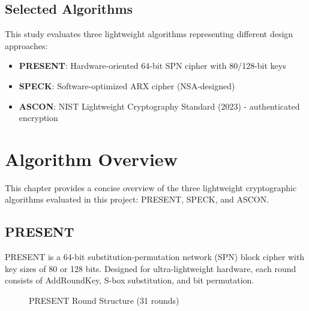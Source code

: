 \documentclass[12pt]{report}
\begin{document}
\section{Selected Algorithms}

This study evaluates three lightweight algorithms representing different design approaches:

\begin{itemize}
    \item \textbf{PRESENT}: Hardware-oriented 64-bit SPN cipher with 80/128-bit keys
    \item \textbf{SPECK}: Software-optimized ARX cipher (NSA-designed)
    \item \textbf{ASCON}: NIST Lightweight Cryptography Standard (2023) - authenticated encryption
\end{itemize}

\chapter{Algorithm Overview}

This chapter provides a concise overview of the three lightweight cryptographic algorithms
evaluated in this project: PRESENT, SPECK, and ASCON.

\section{PRESENT}

PRESENT is a 64-bit substitution-permutation network (SPN) block cipher with key sizes of 80 or 128 bits.
Designed for ultra-lightweight hardware, each round consists of AddRoundKey, S-box substitution, and bit permutation.

\begin{figure}[H]
    \centering
    \caption{PRESENT Round Structure (31 rounds)}
    \label{fig:present-round}
\end{figure}
\end{document}
